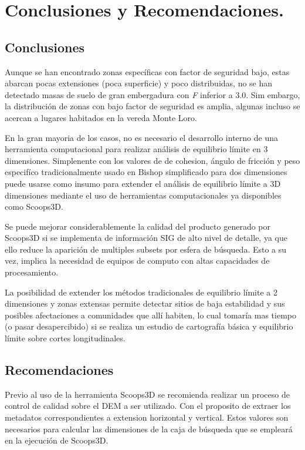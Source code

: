 

\chapter{Conclusiones y Recomendaciones.}

\section{Conclusiones}


Aunque se han encontrado zonas espec\'ificas con factor de seguridad bajo, estas abarcan pocas extensiones (poca superficie) y poco distribuidas, no se han detectado masas de suelo de gran embergadura con \textit{F} inferior a 3.0. Sim embargo, la distribuci\'on de zonas con bajo factor de seguridad es amplia, algunas incluso se acercan a lugares habitados en la vereda Monte Loro.

En la gran mayoria de los casos, no es necesario el desarrollo interno de una herramienta computacional para realizar an\'alisis de equilibrio l\'imite en 3 dimensiones. Simplenente con los valores de de cohesion, \'angulo de fricci\'on y peso especif\'ico tradicionalmente usado en Bishop simplificado para dos dimensiones puede usarse como insumo para extender el an\'alisis  de equilibrio l\'imite a 3D dimensiones mediante el uso de herramientas computacionales ya disponibles como Scoops3D.

Se puede mejorar considerablemente la calidad del producto generado por Scoops3D si se implementa de informaci\'on SIG de alto nivel de detalle, ya que ello reduce la aparici\'on de multiples subsets por esfera de b\'usqueda. Esto a su vez, implica la necesidad de equipos de computo con altas capacidades de procesamiento.


La posibilidad de extender los m\'etodos tradicionales de equilibrio l\'imite a 2 dimensiones y zonas extensas permite detectar sitios de baja estabilidad y sus posibles afectaciones a comunidades que all\'i habiten, lo cual tomar\'ia mas tiempo (o pasar desapercibido) si se realiza un estudio de cartograf\'ia b\'asica y equilibrio l\'imite sobre cortes longitudinales.


\section{Recomendaciones}

Previo al uso de la herramienta Scoops3D se recomienda  realizar un proceso de control de calidad sobre el DEM a ser utilizado. Con el proposito de extraer los metadatos correspondientes a extension horizontal y vertical. Estos valores son necesarios para calcular las dimensiones de la caja de b\'usqueda que se emplear\'a en la ejecuci\'on de Scoops3D.

